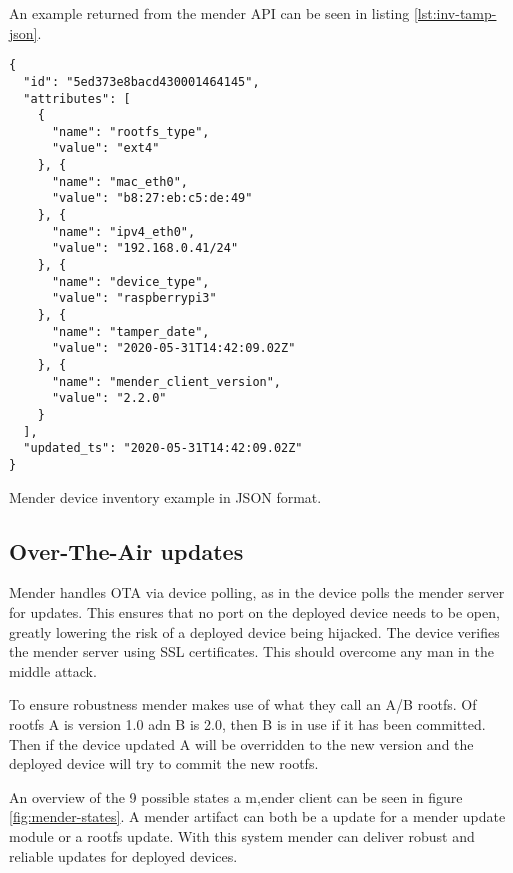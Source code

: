 \documentclass[../../main.tex]{subfiles}
\begin{document}
An example returned from the mender API can be seen in listing \ref{lst:inv-tamp-json}.

\begin{listing}
\begin{verbatim}
{
  "id": "5ed373e8bacd430001464145",
  "attributes": [
    {
      "name": "rootfs_type",
      "value": "ext4"
    }, {
      "name": "mac_eth0",
      "value": "b8:27:eb:c5:de:49"
    }, {
      "name": "ipv4_eth0",
      "value": "192.168.0.41/24"
    }, {
      "name": "device_type",
      "value": "raspberrypi3"
    }, {
      "name": "tamper_date",
      "value": "2020-05-31T14:42:09.02Z"
    }, {
      "name": "mender_client_version",
      "value": "2.2.0"
    }
  ],
  "updated_ts": "2020-05-31T14:42:09.02Z"
}

\end{verbatim}
\caption{Mender device inventory example in JSON format.}
\label{lst:inv-tamp-json}
\end{listing}



\subsection{Over-The-Air updates}%
\label{sub:over_the_air_updates}

Mender handles OTA via device polling, as in the device polls the mender server for updates.
This ensures that no port on the deployed device needs to be open, greatly lowering the risk of
a deployed device being hijacked.
The device verifies the mender server using SSL certificates.
This should overcome any man in the middle attack.

To ensure robustness mender makes use of what they call an A/B rootfs.
Of rootfs A is version 1.0 adn B is 2.0, then B is in use if it has been committed.
Then if the device updated A will be overridden to the new version and the deployed device will
try to commit the new rootfs.

An overview of the 9 possible states a m,ender client can be seen in figure \ref{fig:mender-states}.
A mender artifact can both be a update for a mender update module or a rootfs update.
With this system mender can deliver robust and reliable updates for deployed devices.
\end{document}
